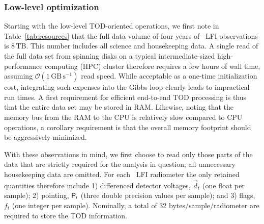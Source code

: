 \documentclass[twocolumn]{aa}
\renewcommand{\d}[0]{\vec{d}}
\renewcommand{\P}[0]{\tens{P}}
\begin{document}
\subsubsection{Low-level optimization}

Starting with the low-level TOD-oriented operations, we first note in
Table~\ref{tab:resources} that the full data volume of four years of
\Planck\ LFI observations is 8\,TB. This number includes all science
and housekeeping data. A single read of the full data set from
spinning disks on a typical intermediate-sized high-performance
computing (HPC) cluster therefore requires a few hours of wall time,
assuming $\mathcal{O}(1\,\mathrm{GB}\,\mathrm{s^{-1}})$ read
speed. While acceptable as a one-time initialization cost, integrating
such expenses into the Gibbs loop clearly leads to impractical run
times. A first requirement for efficient end-to-end TOD processing is
thus that the entire data set may be stored in RAM. Likewise, noting
that the memory bus from the RAM to the CPU is relatively slow
compared to CPU operations, a corollary requirement is that the
overall memory footprint should be aggressively minimized.

With these observations in mind, we first choose to read only those
parts of the data that are strictly required for the analysis in
question; all unnecessary housekeeping data are omitted. For each
\Planck\ LFI radiometer the only retained quantities therefore include
1) differenced detector voltages, $\d_t$ (one float per sample); 2)
pointing, $\P_t$ (three double precision values per sample); and 3)
flags, $f_t$ (one integer per sample). Nominally, a total of 32
bytes/sample/radiometer are required to store the TOD information.
\end{document}
